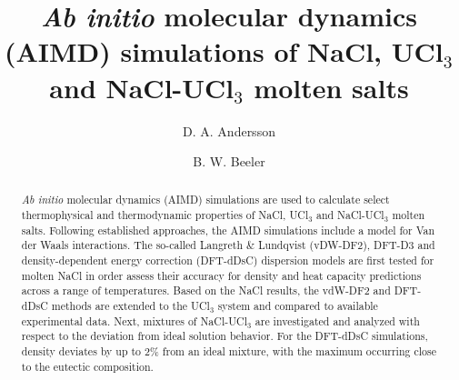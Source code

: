 \documentclass[preprint,3p,10pt,onecolumn,number,sort&compress]{elsarticle}
\begin{document}
\begin{frontmatter}

\title{\textit{Ab initio} molecular dynamics (AIMD) simulations of NaCl, UCl$_3$ and NaCl-UCl$_3$ molten salts}

\author[label1]{D. A. Andersson}
\author[label2,label3]{B. W. Beeler}
\address[label1]{Los Alamos National Laboratory}
\address[label2]{North Carolina State University}
\address[label3]{Idaho National Laboratory}


\begin{abstract}
\textit{Ab initio} molecular dynamics (AIMD) simulations are used to calculate select thermophysical %
and thermodynamic %
properties of NaCl, UCl$_3$ and NaCl-UCl$_3$ molten salts. Following established approaches, the AIMD simulations %
include a model for Van der Waals interactions. The so-called Langreth \& Lundqvist (vDW-DF2), DFT-D3 and density-dependent energy correction (DFT-dDsC) dispersion models are first tested for molten NaCl in order assess their accuracy for density and heat capacity predictions across a range of temperatures. %
Based on the NaCl results, the vdW-DF2 and  DFT-dDsC methods are extended to the UCl$_3$ system and compared to available experimental data. %
Next, mixtures of NaCl-UCl$_3$ are investigated and analyzed with respect to the deviation from ideal solution behavior. %
For the DFT-dDsC simulations, density deviates by up to 2\% from an ideal mixture, with the maximum occurring close to the eutectic composition. %

\end{abstract}
\end{frontmatter}
\end{document}
